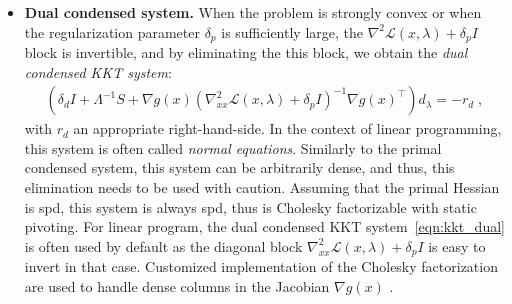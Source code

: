 \documentclass{article}
\begin{document}
\begin{itemize}[leftmargin=*,itemsep=0pt,parsep=0pt,partopsep=0pt]
\item \textbf{Dual condensed system.}
When the problem is strongly convex or when the regularization parameter $\delta_p$ is sufficiently large, the $\nabla^2 \mathcal{L}(x,\lambda) + \delta_p I$ block is invertible, and by eliminating the this block, we obtain the \emph{dual condensed KKT system}:
\begin{align}\label{eqn:kkt_dual}
  \left(\delta_d I + \Lambda^{-1}S + \nabla g(x)\left(\nabla_{x x}^2 \mathcal{L}(x,\lambda) + \delta_p I\right)^{-1} \nabla g(x)^\top\right)
  d_\lambda = - r_d \; ,
\end{align}
with $r_d$ an appropriate right-hand-side.
In the context of linear programming, this system is often called \emph{normal equations}.
Similarly to the primal condensed system, this system can be arbitrarily dense, and thus, this elimination needs to be used with caution. Assuming that the primal Hessian is \gls*{spd}, this system is always \gls*{spd}, thus is Cholesky factorizable with static pivoting.
For linear program, the dual condensed KKT system~\cref{eqn:kkt_dual} is often used
by default as the diagonal block $\nabla^2_{x x} \mathcal{L}(x, \lambda) + \delta_p I$ is easy
to invert in that case. Customized implementation of the Cholesky factorization
  are used to handle dense columns in the Jacobian $\nabla g(x)$ \cite{}.
\end{itemize}
\end{document}
